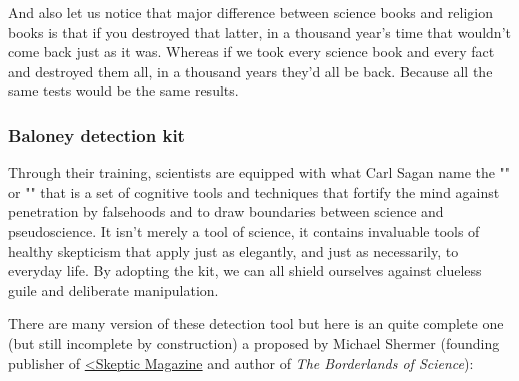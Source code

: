 	And also let us notice that major difference between science books and religion books is that if you destroyed that latter, in a thousand year's time that wouldn't come back just as it was. Whereas if we took every science book and every fact and destroyed them all, in a thousand years they'd all be back. Because all the same tests would be the same results.
	
	\pagebreak
	\subsubsection{Baloney detection kit}
	Through their training, scientists are equipped with what Carl Sagan name the "" or "" that is a set of cognitive tools and techniques that fortify the mind against penetration by falsehoods and to draw boundaries between science and pseudoscience. It isn't merely a tool of science, it contains invaluable tools of healthy skepticism that apply just as elegantly, and just as necessarily, to everyday life. By adopting the kit, we can all shield ourselves against clueless guile and deliberate manipulation. 

	There are many version of these detection tool but here is an quite complete one (but still incomplete by construction) a proposed by Michael Shermer (founding publisher of \href{http://www.skeptic.com}{<Skeptic Magazine} and author of \textit{The Borderlands of Science}):
	

